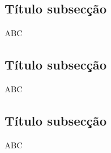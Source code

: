 
\subsection{Título subsecção}

ABC

\subsection{Título subsecção}

ABC

\subsection{Título subsecção}

ABC

